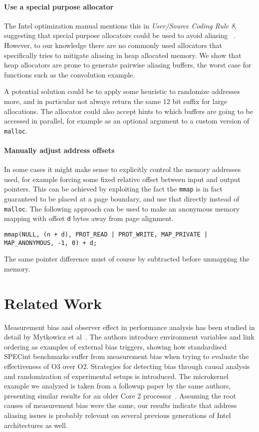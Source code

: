 \documentclass[prodmode,acmtaco]{acmsmall}
\begin{document}
\paragraph{Use a special purpose allocator}
The Intel optimization manual mentions this in \emph{User/Source Coding Rule 8}, suggesting that special purpose allocators could be used to avoid aliasing ~\cite{OptimizationManual}.
However, to our knowledge there are no commonly used allocators that specifically tries to mitigate aliasing in heap allocated memory.
We show that heap allocators are prone to generate pairwise aliasing buffers, the worst case for functions such as the convolution example.

A potential solution could be to apply some heuristic to randomize addresses more, and in particular not always return the same 12 bit suffix for large allocations.
The allocator could also accept hints to which buffers are going to be accessed in parallel, for example as an optional argument to a custom version of \texttt{malloc}.


\paragraph{Manually adjust address offsets}
In some cases it might make sense to explicitly control the memory addresses used, for example forcing some fixed relative offset between input and output pointers.
This can be achieved by exploiting the fact the \texttt{mmap} is in fact guaranteed to be placed at a page boundary, and use that directly instead of \texttt{malloc}.
The following approach can be used to make an anonymous memory mapping with offset \texttt{d} bytes away from page alignment.
\begin{lstlisting}[breaklines=true]
    mmap(NULL, (n + d), PROT_READ | PROT_WRITE, MAP_PRIVATE | MAP_ANONYMOUS, -1, 0) + d;
\end{lstlisting}
The same pointer difference must of course by subtracted before unmapping the memory.


\section{Related Work}
\label{sec:related}
Measurement bias and observer effect in performance analysis has been studied in detail by Mytkowicz et al~.
The authors introduce environment variables and link ordering as examples of external bias triggers, showing how standardised {\small SPECint} benchmarks suffer from measurement bias when trying to evaluate the effectiveness of O3 over O2. 
Strategies for detecting bias through causal analysis and randomization of experimental setups is introduced.
The microkernel example we analyzed is taken from a followup paper by the same authors, presenting similar results for an older Core 2 processor~\cite{Mytkowicz:2009:WrongData}.
Assuming the root causes of measurement bias were the same, our results indicate that address aliasing issues is probably relevant on several previous generations of Intel architectures as well.
\end{document}
